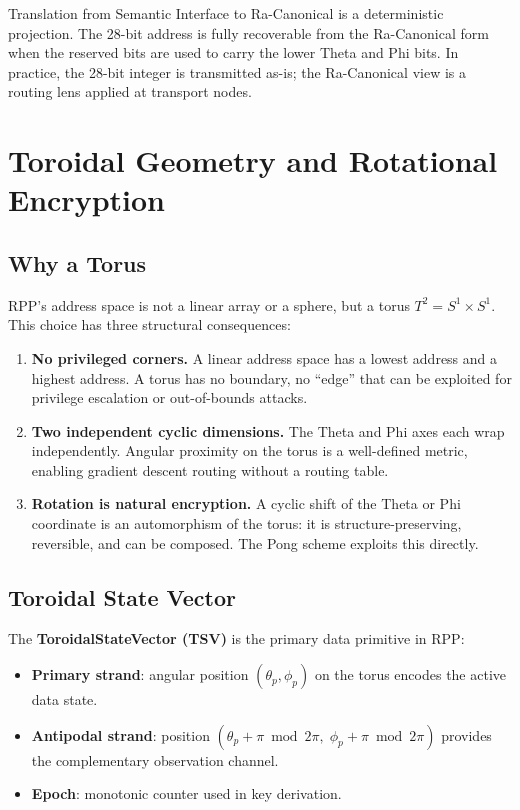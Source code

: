 \documentclass[11pt,a4paper]{article}
\begin{document}
Translation from Semantic Interface to Ra-Canonical is a deterministic projection. The 28-bit address is fully recoverable from the Ra-Canonical form when the reserved bits are used to carry the lower Theta and Phi bits. In practice, the 28-bit integer is transmitted as-is; the Ra-Canonical view is a routing lens applied at transport nodes.

\section{Toroidal Geometry and Rotational Encryption}

\subsection{Why a Torus}

RPP's address space is not a linear array or a sphere, but a torus $T^2 = S^1 \times S^1$. This choice has three structural consequences:

\begin{enumerate}
    \item \textbf{No privileged corners.} A linear address space has a lowest address and a highest address. A torus has no boundary, no ``edge'' that can be exploited for privilege escalation or out-of-bounds attacks.
    \item \textbf{Two independent cyclic dimensions.} The Theta and Phi axes each wrap independently. Angular proximity on the torus is a well-defined metric, enabling gradient descent routing without a routing table.
    \item \textbf{Rotation is natural encryption.} A cyclic shift of the Theta or Phi coordinate is an automorphism of the torus: it is structure-preserving, reversible, and can be composed. The Pong scheme exploits this directly.
\end{enumerate}

\subsection{Toroidal State Vector}

The \textbf{ToroidalStateVector (TSV)} is the primary data primitive in RPP:

\begin{itemize}
    \item \textbf{Primary strand}: angular position $(\theta_p, \phi_p)$ on the torus encodes the active data state.
    \item \textbf{Antipodal strand}: position $(\theta_p + \pi \bmod 2\pi,\; \phi_p + \pi \bmod 2\pi)$ provides the complementary observation channel.
    \item \textbf{Epoch}: monotonic counter used in key derivation.
\end{itemize}
\end{document}
